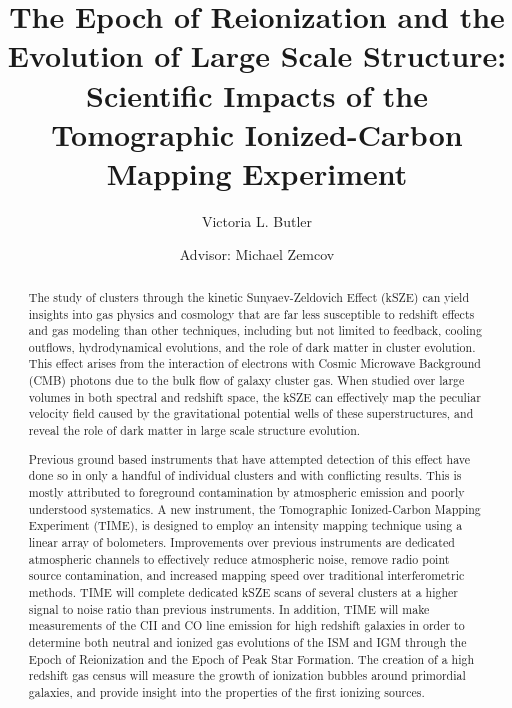 \documentclass[manuscript]{aastex}
\begin{document}
\renewcommand{\thepage}{\roman{page}}
\title{The Epoch of Reionization and the Evolution of Large Scale Structure: Scientific Impacts of the Tomographic Ionized-Carbon Mapping Experiment}
\author{Victoria L. Butler}
\author{Advisor: Michael Zemcov}

\begin{abstract}
The study of clusters through the kinetic Sunyaev-Zeldovich Effect (kSZE) can yield insights into gas physics and cosmology that are far less susceptible to redshift effects and gas modeling than other techniques, including but not limited to feedback, cooling outflows, hydrodynamical evolutions, and the role of dark matter in cluster evolution. This effect arises from the interaction of electrons with Cosmic Microwave Background (CMB) photons due to the bulk flow of galaxy cluster gas. When studied over large volumes in both spectral and redshift space, the kSZE can effectively map the peculiar velocity field caused by the gravitational potential wells of these superstructures, and reveal the role of dark matter in large scale structure evolution. 

Previous ground based instruments that have attempted detection of this effect have done so in only a handful of individual clusters and with conflicting results. This is mostly attributed to foreground contamination by atmospheric emission and poorly understood systematics. A new instrument, the Tomographic Ionized-Carbon Mapping Experiment (TIME), is designed to employ an intensity mapping technique using a linear array of bolometers. Improvements over previous instruments are dedicated atmospheric channels to effectively reduce atmospheric noise, remove radio point source contamination, and increased mapping speed over traditional interferometric methods. TIME will complete dedicated kSZE scans of several clusters at a higher signal to noise ratio than previous instruments. In addition, TIME will make measurements of the CII and CO line emission for high redshift galaxies in order to determine both neutral and ionized gas evolutions of the ISM and IGM through the Epoch of Reionization and the Epoch of Peak Star Formation. The creation of a high redshift gas census will measure the growth of ionization bubbles around primordial galaxies, and provide insight into the properties of the first ionizing sources.
\end{abstract}
\end{document}

